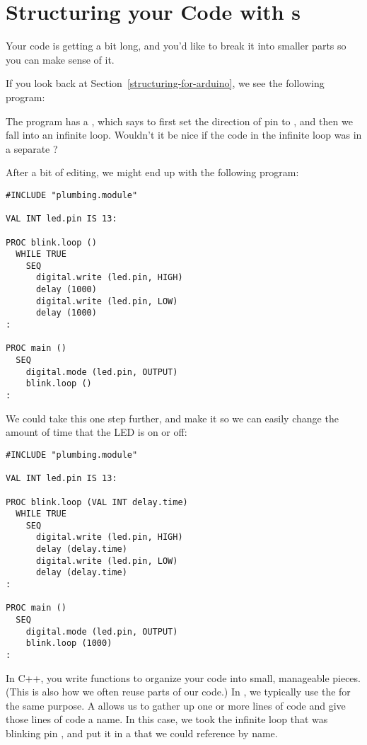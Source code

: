 \section{Structuring your Code with {\PROC}s}
\problem
Your code is getting a bit long, and you'd like to break it into smaller parts so you can make sense of it.

\solution
If you look back at Section~\vref{structuring-for-arduino}, we see the following program:



The program has a \SEQ, which says to first set the direction of pin \pinthirteen to \OUTPUT, and then we fall into an infinite loop. Wouldn't it be nice if the code in the infinite loop was in a separate \PROC?

After a bit of editing, we might end up with the following program:

\begin{lstlisting}
#INCLUDE "plumbing.module"

VAL INT led.pin IS 13:

PROC blink.loop ()
  WHILE TRUE
    SEQ
      digital.write (led.pin, HIGH)
      delay (1000)
      digital.write (led.pin, LOW)
      delay (1000)
:

PROC main ()
  SEQ
    digital.mode (led.pin, OUTPUT)
    blink.loop ()
:
\end{lstlisting}

We could take this one step further, and make it so we can easily change the amount of time that the LED is on or off:

\begin{lstlisting}
#INCLUDE "plumbing.module"

VAL INT led.pin IS 13:

PROC blink.loop (VAL INT delay.time)
  WHILE TRUE
    SEQ
      digital.write (led.pin, HIGH)
      delay (delay.time)
      digital.write (led.pin, LOW)
      delay (delay.time)
:

PROC main ()
  SEQ
    digital.mode (led.pin, OUTPUT)
    blink.loop (1000)
:
\end{lstlisting}

\discussion
In C++, you write functions to organize your code into small, manageable pieces. (This is also how we often reuse parts of our code.) In \occam, we typically use the \PROC for the same purpose. A \PROC allows us to gather up one or more lines of code and give those lines of code a name. In this case, we took the infinite loop that was blinking pin \pinthirteen, and put it in a \PROC that we could reference by name.

